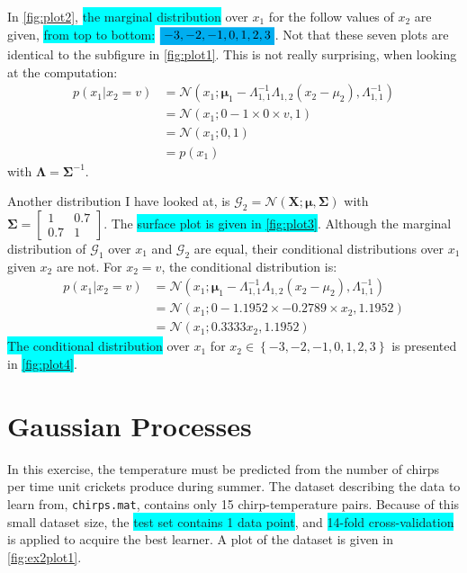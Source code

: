 \documentclass[a4paper,11pt]{article}
\newcommand{\V}[1]{\ensuremath{\boldsymbol{#1}}}
\newcommand{\mean}{\ensuremath{\boldsymbol{\mu}}}
\newcommand{\cov}{\ensuremath{\boldsymbol{\Sigma}}}
\newcommand{\npdf}{\ensuremath{\mathcal{N}}}
\newcommand{\hl}[1]{\colorbox{cyan}{#1}}
\newcommand{\mhl}[1]{\mathchoice%
  {\colorbox{cyan}{$\displaystyle#1$}}%
  {\colorbox{cyan}{$\textstyle#1$}}%
  {\colorbox{cyan}{$\scriptstyle#1$}}%
  {\colorbox{cyan}{$\scriptscriptstyle#1$}}}
\begin{document}
  In \autoref{fig:plot2}, \hl{the marginal distribution} over $x_1$ for the follow values of $x_2$ are given, \hl{from top to bottom:} $\mhl{-3, -2, -1, 0, 1, 2, 3}$.  Not that these seven plots are identical to the subfigure in \autoref{fig:plot1}.  This is not really surprising, when looking at the computation:
  \begin{align*}
    p(x_1 | x_2 = v) 
    &= \npdf(x_1; \mean_1 - \Lambda_{1,1}^{-1} \Lambda_{1,2} (x_2 - \mu_2), \Lambda_{1,1}^{-1}) \\
    &= \npdf(x_1; 0 - 1  \times 0 \times v, 1) \\
    &= \npdf(x_1; 0, 1) \\
    &= p(x_1)
  \end{align*}
  with $\V{\Lambda} = \cov^{-1}$.

  Another distribution I have looked at, is $\mathcal G_2 = \npdf(\V{X}; \mean, \cov)$ with $\cov = \begin{bmatrix}1 & 0.7 \\ 0.7 & 1\end{bmatrix}$.  The \hl{surface plot is given in \autoref{fig:plot3}}.  Although the marginal distribution of $\mathcal G_1$ over $x_1$ and $\mathcal G_2$ are equal, their conditional distributions over $x_1$ given $x_2$ are not.  For $x_2 = v$, the conditional distribution is:
    \begin{align*}
      p(x_1 | x_2 = v)
      &= \npdf(x_1; \mean_1 - \Lambda_{1,1}^{-1} \Lambda_{1,2} (x_2 - \mu_2), \Lambda_{1,1}^{-1}) \\
      &= \npdf(x_1; 0 - 1.1952 \times -0.2789 \times x_2, 1.1952) \\
      &= \npdf(x_1; 0.3333 x_2, 1.1952)
    \end{align*}
\hl{The conditional distribution} over $x_1$ for $x_2 \in \left\{-3, -2, -1, 0, 1, 2, 3\right\}$ is presented in \hl{\autoref{fig:plot4}}.


\section{Gaussian Processes}
In this exercise, the temperature must be predicted from the number of chirps per time unit crickets produce during summer.  The dataset describing the data to learn from, \texttt{chirps.mat}, contains only 15 chirp-temperature pairs.  Because of this small dataset size, the \hl{test set contains 1 data point}, and \hl{14-fold cross-validation} is applied to acquire the best learner.  A plot of the dataset is given in \autoref{fig:ex2plot1}.
\end{document}
